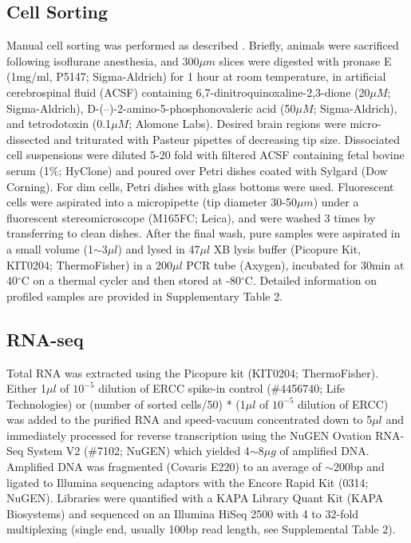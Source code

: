 \subsection{Cell Sorting}
Manual cell sorting was performed as described \citep{Hempel_2007, Sugino_2014}. Briefly, animals were sacrificed following isoflurane anesthesia, and 300$\mu m$ slices were digested with pronase E (1mg/ml, P5147; Sigma-Aldrich) for 1 hour at room temperature, in artificial cerebrospinal fluid (ACSF) containing 6,7-dinitroquinoxaline-2,3-dione (20$\mu M$; Sigma-Aldrich), D-(–)-2-amino-5-phosphonovaleric acid (50$\mu M$; Sigma-Aldrich), and tetrodotoxin (0.1$\mu M$; Alomone Labs). Desired brain regions were micro-dissected and triturated with Pasteur pipettes of decreasing tip size. Dissociated cell suspensions were diluted 5-20 fold with filtered ACSF containing fetal bovine serum (1\%; HyClone) and poured over Petri dishes coated with Sylgard (Dow Corning). For dim cells, Petri dishes with glass bottoms were used. Fluorescent cells were aspirated into a micropipette (tip diameter 30-50$\mu m$) under a fluorescent stereomicroscope (M165FC; Leica), and were washed 3 times by transferring to clean dishes. After the final wash, pure samples were aspirated in a small volume (1$\sim$3$\mu l$) and lysed in 47$\mu l$ XB lysis buffer (Picopure Kit, KIT0204; ThermoFisher) in a 200$\mu l$ PCR tube (Axygen), incubated for 30min at 40$^{\circ}$C on a thermal cycler and then stored at -80$^{\circ}$C. Detailed information on profiled samples are provided in Supplementary Table 2.

\subsection{RNA-seq}
Total RNA was extracted using the Picopure kit (KIT0204; ThermoFisher). Either 1$\mu l$ of $10^{-5}$ dilution of ERCC spike-in control (\#4456740; Life Technologies) or (number of sorted cells/50) * (1$\mu l$ of $10^{-5}$ dilution of ERCC) was added to the purified RNA and speed-vacuum concentrated down to 5$\mu l$ and immediately processed for reverse transcription using the NuGEN Ovation RNA-Seq System V2 (\#7102; NuGEN) which yielded 4$\sim$8$\mu g$ of amplified DNA. Amplified DNA was fragmented (Covaris E220) to an average of $\sim$200bp and ligated to Illumina sequencing adaptors with the Encore Rapid Kit (0314; NuGEN). Libraries were quantified with a KAPA Library Quant Kit (KAPA Biosystems) and sequenced on an Illumina HiSeq 2500 with 4 to 32-fold multiplexing (single end, usually 100bp read length, see Supplemental Table 2).

